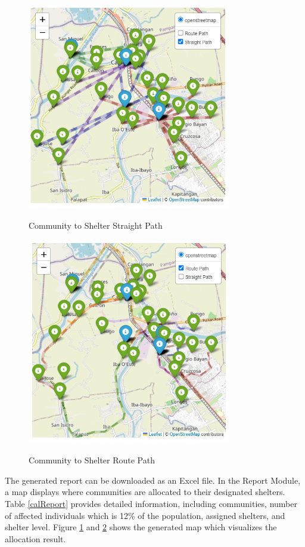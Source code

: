 	\begin{figure}[h!]
		\caption{Community to Shelter Straight Path}
		\centering
		\includegraphics[width=3.5in]{Chapter 4/straight path}
		\label{straightpath}
	\end{figure}
	
	\begin{figure}[h!]
		\caption{Community to Shelter Route Path}
		\centering
		\includegraphics[width=3.5in]{Chapter 4/route path}
		\label{routepath}
	\end{figure}
	
	The generated report can be downloaded as an Excel file. In the Report Module, a map displays where communities are allocated to their designated shelters. Table \ref{calReport} provides detailed information, including communities, number of affected individuals which is 12\% of the population, assigned shelters, and shelter level. Figure \ref{straightpath} and \ref{routepath} shows the generated map which visualizes the allocation result.
	
